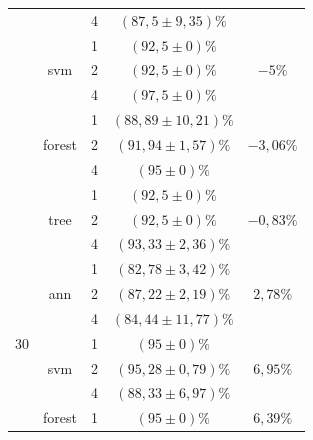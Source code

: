 \begin{table}[]
\begin{tabular}{|c|c|c|c|c|}
                      &                         & 4                & $ (87,5 \pm 9,35) \% $    &\\ \cline{2-5} 
                      & \multirow{3}{*}{svm}    & 1                & $ (92,5 \pm 0) \% $       & \multirow{3}{*}{$-5 \%$} \\ \cline{3-4} 
                      &                         & 2                & $ (92,5 \pm 0) \% $       &\\ \cline{3-4} 
                      &                         & 4                & $ (97,5 \pm 0) \% $       &\\ \cline{2-5} 
                      & \multirow{3}{*}{forest} & 1                & $ (88,89 \pm 10,21) \% $  & \multirow{3}{*}{$-3,06 \%$} \\ \cline{3-4} 
                      &                         & 2                & $ (91,94 \pm 1,57) \% $  & \\ \cline{3-4} 
                      &                         & 4                & $ (95 \pm 0) \% $         &\\ \cline{2-5} 
                      & \multirow{3}{*}{tree}   & 1                & $ (92,5 \pm 0) \% $       & \multirow{3}{*}{$-0,83 \%$} \\ \cline{3-4} 
                      &                         & 2                & $ (92,5 \pm 0) \% $       &\\ \cline{3-4} 
                      &                         & 4                & $ (93,33 \pm 2,36) \% $   &\\ \hline
\multirow{12}{*}{30}  & \multirow{3}{*}{ann}    & 1                & $ (82,78 \pm 3,42) \% $   & \multirow{3}{*}{$2,78\%$} \\ \cline{3-4} 
                      &                         & 2                & $ (87,22 \pm 2,19) \% $  & \\ \cline{3-4} 
                      &                         & 4                & $ (84,44 \pm 11,77) \% $  &\\ \cline{2-5} 
                      & \multirow{3}{*}{svm}    & 1                & $ (95 \pm 0) \% $        & \multirow{3}{*}{$6,95\%$} \\ \cline{3-4} 
                      &                         & 2                & $ (95,28 \pm 0,79) \% $   &\\ \cline{3-4} 
                      &                         & 4                & $ (88,33 \pm 6,97) \% $   &\\ \cline{2-5} 
                      & \multirow{3}{*}{forest} & 1                & $ (95 \pm 0) \%  $        & \multirow{3}{*}{$6,39\%$} \\ \cline{3-4} 

\end{tabular}
\end{table}
